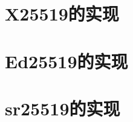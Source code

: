 \documentclass{article}
\begin{document}
\section{\textsf{X25519}的实现}

\section{\textsf{Ed25519}的实现}

\section{\textsf{sr25519}的实现}
\end{document}
